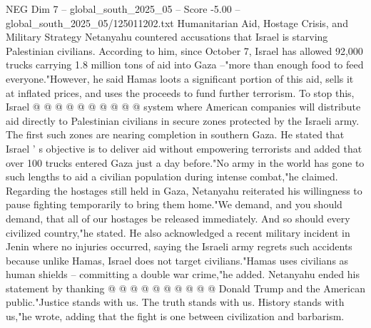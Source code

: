 \begin{textsample}{NEG Dim 7 – global\_south\_2025\_05 – Score -5.00 – global\_south\_2025\_05/125011202.txt}
Humanitarian Aid, Hostage Crisis, and Military Strategy Netanyahu countered accusations that Israel is starving Palestinian civilians.
According to him, since October 7, Israel has allowed 92,000 trucks carrying 1.8 million tons of aid into Gaza --"more than enough food to feed everyone."However, he said Hamas loots a significant portion of this aid, sells it at inflated prices, and uses the proceeds to fund further terrorism.
To stop this, Israel @ @ @ @ @ @ @ @ @ @ system where American companies will distribute aid directly to Palestinian civilians in secure zones protected by the Israeli army.
The first such zones are nearing completion in southern Gaza.
He stated that Israel ' s objective is to deliver aid without empowering terrorists and added that over 100 trucks entered Gaza just a day before."No army in the world has gone to such lengths to aid a civilian population during intense combat,"he claimed.
Regarding the hostages still held in Gaza, Netanyahu reiterated his willingness to pause fighting temporarily to bring them home."We demand, and you should demand, that all of our hostages be released immediately.
And so should every civilized country,"he stated.
He also acknowledged a recent military incident in Jenin where no injuries occurred, saying the Israeli army regrets such accidents because unlike Hamas, Israel does not target civilians."Hamas uses civilians as human shields -- committing a double war crime,"he added.
Netanyahu ended his statement by thanking @ @ @ @ @ @ @ @ @ @ Donald Trump and the American public."Justice stands with us.
The truth stands with us.
History stands with us,"he wrote, adding that the fight is one between civilization and barbarism.

\end{textsample}
